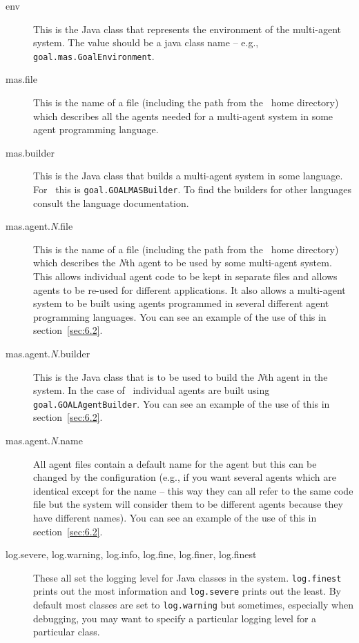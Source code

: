 \begin{sloppypar}
\begin{description}
\item[env] This is the Java class that represents the environment of the multi-agent system.  The value should be a java class name -- e.g., \texttt{goal.mas.GoalEnvironment}.
\item[mas.file] This is the name of a file (including the path from the \mcapl\ home directory) which describes all the agents needed for a multi-agent system in some agent programming language.
\item[mas.builder] This is the Java class that builds a multi-agent system in some language.  For \goal\ this is \texttt{goal.GOALMASBuilder}.  To find the builders for other languages consult the language documentation.
\item[mas.agent.\emph{N}.file] This is the name of a file (including the path from the \mcapl\ home directory) which describes the \emph{N}th agent to be used by some multi-agent system.  This allows individual agent code to be kept in separate files and allows agents to be re-used for different applications.  It also allows a multi-agent system to be built using agents programmed in several different agent programming languages.  You can see an example of the use of this in section~\ref{sec:6.2}.
\item[mas.agent.\emph{N}.builder] This is the Java class that is to be used to build the \emph{N}th agent in the system.  In the case of \goal\ individual agents are built using \texttt{goal.GOALAgentBuilder}.  You can see an example of the use of this in section~\ref{sec:6.2}.
\item[mas.agent.\emph{N}.name] All agent files contain a default name for the agent but this can be changed by the configuration (e.g., if you want several agents which are identical except for the name -- this way they can all refer to the same code file but the system will consider them to be different agents because they have different names).  You can see an example of the use of this in section~\ref{sec:6.2}.
\item[log.severe, log.warning, log.info, log.fine, log.finer, log.finest] These all set the logging level for Java classes in the system.  \texttt{log.finest} prints out the most information and \texttt{log.severe} prints out the least.  By default most classes are set to \texttt{log.warning} but sometimes, especially when debugging, you may want to specify a particular logging level for a particular class. 

\end{description}
\end{sloppypar}
